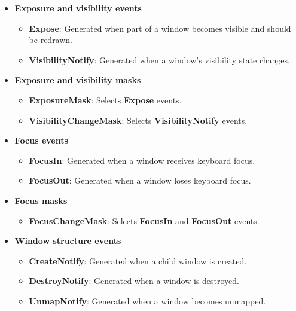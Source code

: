 \documentclass{report}
\begin{document}
\begin{itemize}
\begin{itemize}
                \item \textbf{KeymapStateMask}: Selects \textbf{KeymapNotify} events.
            \end{itemize}
        \item \textbf{Exposure and visibility events}
            \bigbreak \noindent
            \begin{itemize}
                \item \textbf{Expose}: Generated when part of a window becomes visible and should be redrawn.
                \item \textbf{VisibilityNotify}: Generated when a window's visibility state changes.
            \end{itemize}
        \item \textbf{Exposure and visibility masks}
            \bigbreak \noindent
            \begin{itemize}
                \item \textbf{ExposureMask}: Selects \textbf{Expose} events.
                \item \textbf{VisibilityChangeMask}: Selects \textbf{VisibilityNotify} events.
            \end{itemize}
        \item \textbf{Focus events}
            \bigbreak \noindent
            \begin{itemize}
                \item \textbf{FocusIn}: Generated when a window receives keyboard focus.
                \item \textbf{FocusOut}: Generated when a window loses keyboard focus.
            \end{itemize}
        \item \textbf{Focus masks}
            \bigbreak \noindent
            \begin{itemize}
                \item \textbf{FocusChangeMask}: Selects \textbf{FocusIn} and \textbf{FocusOut} events.
            \end{itemize}
        \item \textbf{Window structure events}
            \bigbreak \noindent
            \begin{itemize}
                \item \textbf{CreateNotify}: Generated when a child window is created.
                \item \textbf{DestroyNotify}: Generated when a window is destroyed.
                \item \textbf{UnmapNotify}: Generated when a window becomes unmapped.

\end{itemize}
\end{itemize}
\end{document}
